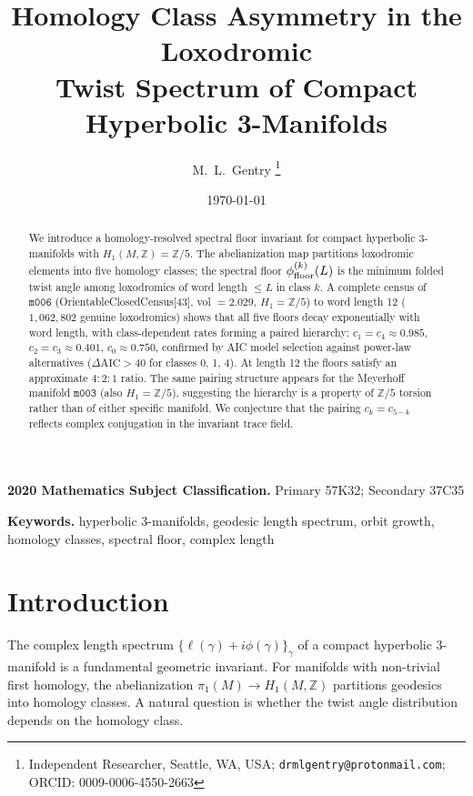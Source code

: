 \documentclass[11pt,a4paper]{article}
\theoremstyle{remark}
\newcommand{\mfld}[1]{\texttt{#1}}
\newcommand{\Zfive}{\mathbb{Z}/5}
\newcommand{\subjclass}[2][2020]{\par\noindent\textbf{#1 Mathematics Subject Classification.} #2\par}
\newcommand{\keywords}[1]{\par\noindent\textbf{Keywords.} #1\par}
\begin{document}
\title{Homology Class Asymmetry in the Loxodromic\\
Twist Spectrum of Compact Hyperbolic 3-Manifolds}

\author{M.~L.~Gentry%
\thanks{Independent Researcher, Seattle, WA, USA;
\texttt{drmlgentry@protonmail.com};
ORCID: 0009-0006-4550-2663}}
\date{\today}
\maketitle

\begin{abstract}
We introduce a homology-resolved spectral floor invariant for compact
hyperbolic 3-manifolds with $H_1(M,\mathbb{Z})=\Zfive$.
The abelianization map partitions loxodromic elements into five
homology classes; the spectral floor
$\phi_{\rm floor}^{(k)}(L)$ is the minimum folded twist angle
among loxodromics of word length $\leq L$ in class $k$.
A complete census of $\mfld{m006}$ (OrientableClosedCensus[43],
vol $= 2.029$, $H_1=\Zfive$) to word length 12
($1{,}062{,}802$ genuine loxodromics) shows that all five floors
decay exponentially with word length, with class-dependent rates
forming a paired hierarchy:
$c_1=c_4\approx 0.985$, $c_2=c_3\approx 0.401$, $c_0\approx 0.750$,
confirmed by AIC model selection against power-law alternatives
($\Delta\mathrm{AIC}>40$ for classes 0, 1, 4).
At length 12 the floors satisfy an approximate $4{:}2{:}1$ ratio.
The same pairing structure appears for the Meyerhoff manifold
$\mfld{m003}$ (also $H_1=\Zfive$), suggesting the hierarchy is
a property of $\Zfive$ torsion rather than of either specific manifold.
We conjecture that the pairing $c_k=c_{5-k}$ reflects complex
conjugation in the invariant trace field.
\end{abstract}

\subjclass[2020]{Primary 57K32; Secondary 37C35}

\keywords{hyperbolic 3-manifolds, geodesic length spectrum, orbit growth,
homology classes, spectral floor, complex length}

\section{Introduction}
\label{sec:intro}

The complex length spectrum
$\{\ell(\gamma)+i\phi(\gamma)\}_\gamma$ of a compact hyperbolic
3-manifold is a fundamental geometric invariant.
For manifolds with non-trivial first homology, the abelianization
$\pi_1(M)\to H_1(M,\mathbb{Z})$ partitions geodesics into homology
classes. A natural question is whether the twist angle distribution
depends on the homology class.
\end{document}

